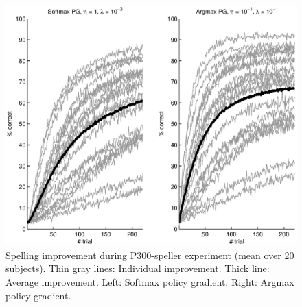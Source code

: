 \documentclass[conference]{IEEEtran}
\begin{document}
\begin{figure}
\centerline{
 \includegraphics[width=\linewidth]{figs-copie/PG_softmax}
}
\caption{Spelling improvement during P300-speller experiment (mean over 20 subjects). 
Thin gray lines: Individual improvement. Thick line: Average improvement. 
Left: Softmax policy gradient. Right: Argmax policy gradient. 
}
\label{fig:PG_ref}
\end{figure}
\end{document}
